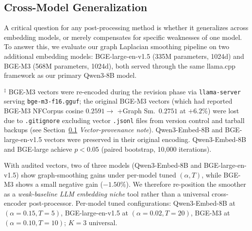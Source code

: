 \documentclass[review,1p]{elsarticle}
\begin{document}
\subsection{Cross-Model Generalization}
\label{subsec:cross-model}

A critical question for any post-processing method is whether it generalizes across embedding models, or merely compensates for specific weaknesses of one model. To answer this, we evaluate our graph Laplacian smoothing pipeline on two additional embedding models: BGE-large-en-v1.5 (335M parameters, 1024d) and BGE-M3 (568M parameters, 1024d), both served through the same llama.cpp framework as our primary Qwen3-8B model.

\begin{table}[ht]
\centering
\caption{Cross-model generalization on NFCorpus (323 queries).}
\label{tab:cross-model}

\vspace{4pt}
{\footnotesize $^\ddagger$ BGE-M3 vectors were re-encoded during the revision phase via \texttt{llama-server} serving \texttt{bge-m3-f16.gguf}; the original BGE-M3 vectors (which had reported BGE-M3 NFCorpus cosine $0.2591 \to$ +Graph Sm.\ $0.2751$ at $+6.2\%$) were lost due to \texttt{.gitignore} excluding vector \texttt{.jsonl} files from version control and tarball backups (see Section~\ref{subsec:cross-model} \textit{Vector-provenance note}). Qwen3-Embed-8B and BGE-large-en-v1.5 vectors were preserved in their original encoding. Qwen3-Embed-8B and BGE-large achieve $p < 0.05$ (paired bootstrap, 10{,}000 iterations).}
\end{table}

With audited vectors, two of three models (Qwen3-Embed-8B and BGE-large-en-v1.5) show graph-smoothing gains under per-model tuned $(\alpha, T)$, while BGE-M3 shows a small negative gain ($-1.50\%$). We therefore re-position the smoother as a \emph{weak-baseline LLM embedding niche} tool rather than a universal cross-encoder post-processor. Per-model tuned configurations: Qwen3-Embed-8B at $(\alpha = 0.15, T = 5)$, BGE-large-en-v1.5 at $(\alpha = 0.02, T = 20)$, BGE-M3 at $(\alpha = 0.10, T = 10)$; $K = 3$ universal.
\end{document}
